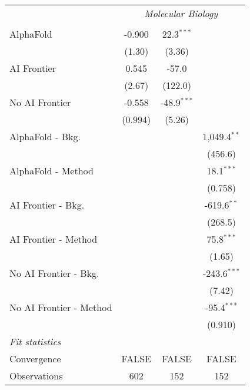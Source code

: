 \begin{tabular}{lccc}
 & \multicolumn{3}{c}{\textit{Molecular Biology}} \\ \\
   AlphaFold               & -0.900  & 22.3$^{***}$  &   \\   
                           & (1.30)  & (3.36)        &   \\   
   AI Frontier             & 0.545   & -57.0         &   \\   
                           & (2.67)  & (122.0)       &   \\   
   No AI Frontier          & -0.558  & -48.9$^{***}$ &   \\   
                           & (0.994) & (5.26)        &   \\   
   AlphaFold - Bkg.        &         &               & 1,049.4$^{**}$\\   
                           &         &               & (456.6)\\   
   AlphaFold - Method      &         &               & 18.1$^{***}$\\   
                           &         &               & (0.758)\\   
   AI Frontier - Bkg.      &         &               & -619.6$^{**}$\\   
                           &         &               & (268.5)\\   
   AI Frontier - Method    &         &               & 75.8$^{***}$\\   
                           &         &               & (1.65)\\   
   No AI Frontier - Bkg.   &         &               & -243.6$^{***}$\\   
                           &         &               & (7.42)\\   
   No AI Frontier - Method &         &               & -95.4$^{***}$\\   
                           &         &               & (0.910)\\   
   \midrule
   \emph{Fit statistics}\\
   Convergence             &FALSE    & FALSE         & FALSE\\  
   Observations            & 602     & 152           & 152\\  
   

\end{tabular}

